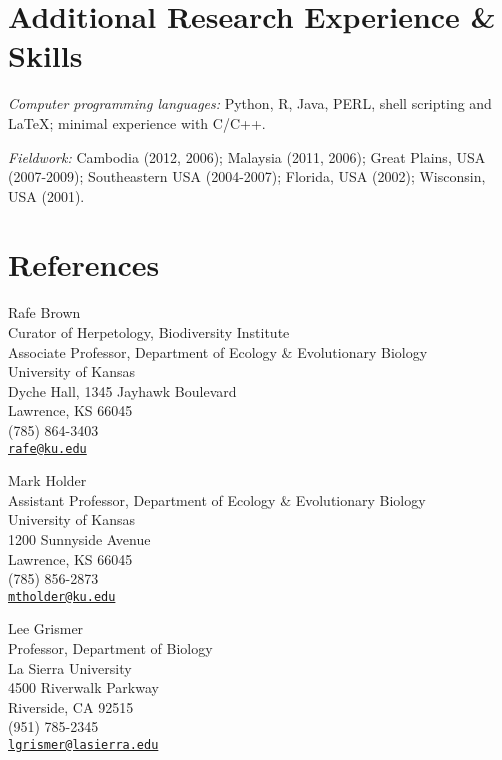 \documentclass[10pt]{article}
\newcommand{\myHangIndent}{\hangindent=5mm}
\newcommand{\myIndent}{\hspace{5mm}}
\begin{document}
\section*{Additional Research Experience \& Skills}
\myHangIndent
{\sffamily\itshape Computer programming languages:} Python, R, Java, PERL,
shell scripting and \LaTeX; minimal experience with C/C++.

\myHangIndent
{\sffamily\itshape Fieldwork:} Cambodia (2012, 2006); Malaysia (2011, 2006);
Great Plains, USA (2007-2009); Southeastern USA (2004-2007); Florida, USA
(2002); Wisconsin, USA (2001).

\newpage
\section*{References}
Rafe Brown \\
\myIndent Curator of Herpetology, Biodiversity Institute \\
\myIndent Associate Professor, Department of Ecology \& Evolutionary Biology \\
\myIndent University of Kansas \\
\myIndent Dyche Hall, 1345 Jayhawk Boulevard \\
\myIndent Lawrence, KS 66045 \\
\myIndent (785) 864-3403 \\
\myIndent \href{mailto:rafe@ku.edu}{\tt rafe@ku.edu}

Mark Holder \\
\myIndent Assistant Professor, Department of Ecology \& Evolutionary Biology \\
\myIndent University of Kansas \\
\myIndent 1200 Sunnyside Avenue \\
\myIndent Lawrence, KS 66045 \\
\myIndent (785) 856-2873 \\
\myIndent \href{mailto:mtholder@ku.edu}{\tt mtholder@ku.edu}

Lee Grismer \\
\myIndent Professor, Department of Biology \\
\myIndent La Sierra University \\
\myIndent 4500 Riverwalk Parkway \\
\myIndent Riverside, CA 92515 \\
\myIndent (951) 785-2345 \\
\myIndent \href{mailto:lgrismer@lasierra.edu}{\tt lgrismer@lasierra.edu}
\end{document}

